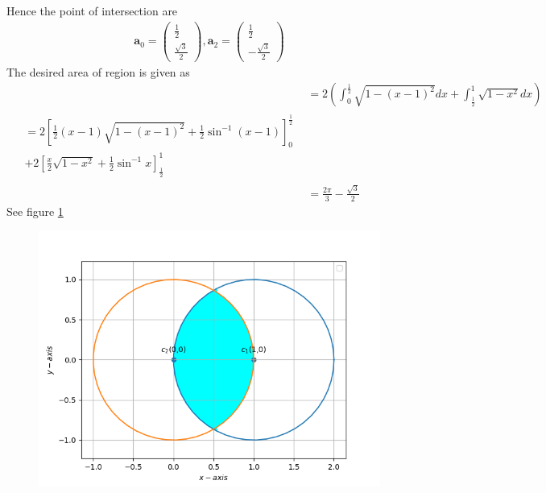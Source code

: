 \documentclass[12pt]{article}
\providecommand{\sbrak}[1]{\ensuremath{{}\left[#1\right]}}
\providecommand{\brak}[1]{\ensuremath{\left(#1\right)}}
\newcommand{\myvec}[1]{\ensuremath{\begin{pmatrix}#1\end{pmatrix}}}
\let\vec\mathbf
\begin{document}
Hence the point of intersection are
\begin{align}
	\vec{a}_0 = \myvec{\frac{1}{2}\\\frac{\sqrt{3}}{2}}, \vec{a}_2 = \myvec{\frac{1}{2}\\-\frac{\sqrt{3}}{2}}
\end{align}
The desired area of region is given as
\begin{align}
	&=2\brak{\int_{0}^{\frac{1}{2}} \sqrt{1-\brak{x-1}^2}dx + \int_{\frac{1}{2}}^{1} \sqrt{1-x^2}dx}\\
	\begin{split}
		&{}=2\sbrak{\frac{1}{2}\brak{x-1}\sqrt{1-\brak{x-1}^2}+\frac{1}{2}\sin^{-1}\brak{x-1}}_{0}^{\frac{1}{2}}\\
		& +2\sbrak{\frac{x}{2}\sqrt{1-x^2}+\frac{1}{2}\sin^{-1}x}_{\frac{1}{2}}^{1}
	\end{split}\\
	&= \frac{2\pi}{3}-\frac{\sqrt{3}}{2}
\end{align}
See figure \ref{fig:Fig1}
\begin{figure}[!h]
	\begin{center} 
	    \includegraphics[width=\columnwidth]{figs/inter1}
	\end{center}
\caption{}
\label{fig:Fig1}
\end{figure}
\end{document}
